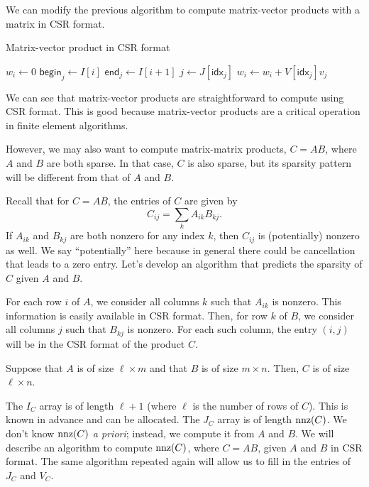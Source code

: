\documentclass{lecture}
\begin{document}
We can modify the previous algorithm to compute matrix-vector products with a matrix in CSR format.

\begin{algorithm}[H]
   \caption{Matrix-vector product in CSR format}
   \begin{algorithmic}[1]
         \State $w_i \gets 0$
         \State $\textsf{begin}_j \gets I[i]$
         \State $\textsf{end}_j \gets I[i+1]$
            \State $j \gets J[\textsf{idx}_j]$
            \State $w_i \gets w_i + V[\textsf{idx}_j] v_j$
         \EndFor
      \EndFor
   \end{algorithmic}
\end{algorithm}

We can see that matrix-vector products are straightforward to compute using CSR format.
This is good because matrix-vector products are a critical operation in finite element algorithms.

However, we may also want to compute matrix-matrix products, $C = AB$, where $A$ and $B$ are both sparse.
In that case, $C$ is also sparse, but its sparsity pattern will be different from that of $A$ and $B$.

Recall that for $C = AB$, the entries of $C$ are given by
\[
   C_{ij} = \sum_k A_{ik} B_{kj}.
\]
If $A_{ik}$ and $B_{kj}$ are both nonzero for any index $k$, then $C_{ij}$ is (potentially) nonzero as well.
We say ``potentially'' here because in general there could be cancellation that leads to a zero entry.
Let's develop an algorithm that predicts the sparsity of $C$ given $A$ and $B$.

For each row $i$ of $A$, we consider all columns $k$ such that $A_{ik}$ is nonzero.
This information is easily available in CSR format.
Then, for row $k$ of $B$, we consider all columns $j$ such that $B_{kj}$ is nonzero.
For each such column, the entry $(i,j)$ will be in the CSR format of the product $C$.

Suppose that $A$ is of size $\ell \times m$ and that $B$ is of size $m \times n$.
Then, $C$ is of size $\ell \times n$.

The $I_C$ array is of length $\ell + 1$ (where $\ell$ is the number of rows of $C$).
This is known in advance and can be allocated.
The $J_C$ array is of length $\operatorname{nnz}(C)$.
We don't know $\operatorname{nnz}(C)$ \textit{a priori}; instead, we compute it from $A$ and $B$.
We will describe an algorithm to compute $\operatorname{nnz}(C)$, where $C = AB$, given $A$ and $B$ in CSR format.
The same algorithm repeated again will allow us to fill in the entries of $J_C$ and $V_C$.
\end{document}
